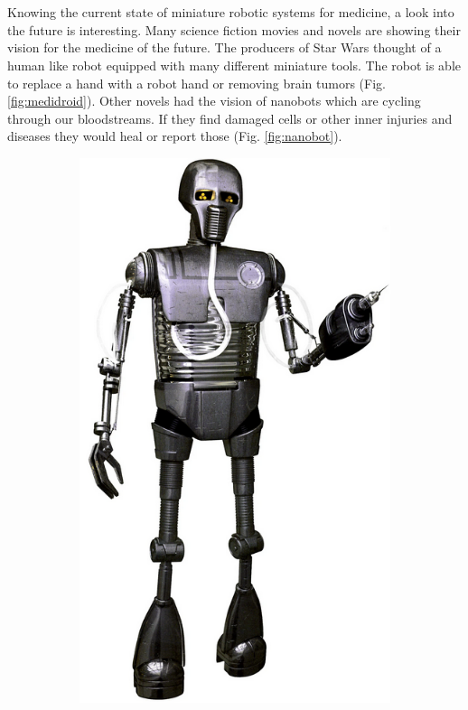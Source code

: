 \chapter{}
\label{sec:future}
Knowing the current state of miniature robotic systems for medicine, a look into the future is interesting. Many science fiction movies and novels are showing their vision for the medicine of the future. The producers of Star Wars thought of a human like robot equipped with many different miniature tools. The robot is able to replace a hand with a robot hand or removing brain tumors (Fig. \ref{fig:medidroid}). Other novels had the vision of nanobots which are cycling through our bloodstreams. If they find damaged cells or other inner injuries and diseases they would heal or report those (Fig. \ref{fig:nanobot}).
\begin{figure}[H]
    \centering
    \begin{subfigure}[b]{0.2\textwidth}
        \includegraphics[width=\textwidth]{Figures/starrwars_medidroid.png}

\end{subfigure}
\end{figure}
